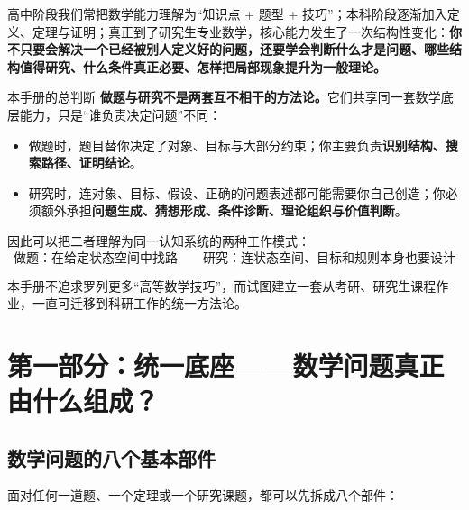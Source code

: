 \documentclass[11pt,a4paper]{ctexart}
\newcommand{\concept}[1]{\textbf{\color{deepblue}#1}}
\begin{document}
高中阶段我们常把数学能力理解为“知识点 + 题型 + 技巧”；本科阶段逐渐加入定义、定理与证明；真正到了研究生专业数学，核心能力发生了一次结构性变化：\concept{你不只要会解决一个已经被别人定义好的问题，还要学会判断什么才是问题、哪些结构值得研究、什么条件真正必要、怎样把局部现象提升为一般理论。}

\begin{corebox}{本手册的总判断}
\textbf{做题与研究不是两套互不相干的方法论。}它们共享同一套数学底层能力，只是“谁负责决定问题”不同：
\begin{itemize}
  \item 做题时，题目替你决定了对象、目标与大部分约束；你主要负责\textbf{识别结构、搜索路径、证明结论}。
  \item 研究时，连对象、目标、假设、正确的问题表述都可能需要你自己创造；你必须额外承担\textbf{问题生成、猜想形成、条件诊断、理论组织与价值判断}。
\end{itemize}
因此可以把二者理解为同一认知系统的两种工作模式：
\[
\boxed{\text{做题：在给定状态空间中找路}}
\qquad
\boxed{\text{研究：连状态空间、目标和规则本身也要设计}}
\]
\end{corebox}

本手册不追求罗列更多“高等数学技巧”，而试图建立一套从考研、研究生课程作业，一直可迁移到科研工作的统一方法论。

\section{第一部分：统一底座——数学问题真正由什么组成？}

\subsection{数学问题的八个基本部件}

面对任何一道题、一个定理或一个研究课题，都可以先拆成八个部件：
\end{document}
